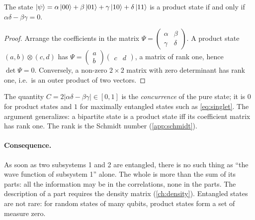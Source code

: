 \begin{proposition}\label{prop:det}
The state $\left|\psi\right\rangle=\alpha\left|00\right\rangle+\beta\left|01\right\rangle+\gamma\left|10\right\rangle+\delta\left|11\right\rangle$ is a product state if and only if $\alpha\delta-\beta\gamma=0$.
\end{proposition}
\begin{proof}
Arrange the coefficients in the matrix $\Psi=\begin{pmatrix}\alpha&\beta\\ \gamma&\delta\end{pmatrix}$. A product state $(a,b)\otimes(c,d)$ has
$\Psi=\begin{pmatrix}a\\b\end{pmatrix}\begin{pmatrix}c&d\end{pmatrix}$, a matrix of rank one, hence $\det\Psi=0$. Conversely, a non-zero $2\times2$ matrix with
zero determinant has rank one, i.e.\ is an outer product of two vectors.
\end{proof}
The quantity $C=2|\alpha\delta-\beta\gamma|\in[0,1]$ is the \emph{concurrence} of the pure state; it is $0$ for product states and $1$ for maximally entangled
states such as \cref{eq:singlet}. The argument generalizes: a bipartite state is a product state iff its coefficient matrix has rank one. The rank is the Schmidt
number (\cref{app:schmidt}).

\paragraph{Consequence.} As soon as two subsystems 1 and 2 are entangled, there is no such thing as ``the wave function of subsystem 1'' alone. The whole is more
than the sum of its parts: all the information may be in the correlations, none in the parts. The description of a part requires the density matrix
(\cref{ch:density}). Entangled states are not rare: for random states of many qubits, product states form a set of measure zero.


